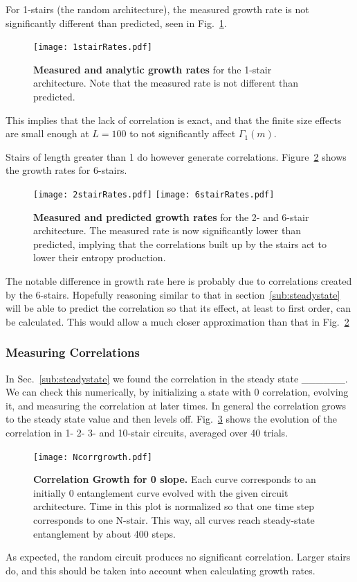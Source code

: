 For 1-stairs (the random architecture), the measured growth rate is not significantly different than predicted, seen in Fig.~\ref{fig:1stairRates}.
\begin{figure}
	\centering
	\texttt{[image: 1stairRates.pdf]}
	\caption{\textbf{Measured and analytic growth rates} for the 1-stair architecture. Note that the measured rate is not different than predicted.}
	\label{fig:1stairRates}
\end{figure}
This implies that the lack of correlation is exact, and that the finite size effects are small enough at $L=100$ to not significantly affect $\Gamma_1(m)$.

Stairs of length greater than 1 do however generate correlations. Figure~\ref{fig:6stairRates} shows the growth rates for 6-stairs. 
\begin{figure}
	\centering
	\texttt{[image: 2stairRates.pdf]}
	\texttt{[image: 6stairRates.pdf]}
	\caption{\textbf{Measured and predicted growth rates} for the 2- and 6-stair architecture. The measured rate is now significantly lower than predicted, implying that the correlations built up by the stairs act to lower their entropy production.}
	\label{fig:6stairRates}
\end{figure}
The notable difference in growth rate here is probably due to correlations created by the 6-stairs. Hopefully reasoning similar to that in section~\ref{sub:steadystate} will be able to predict the correlation so that its effect, at least to first order, can be calculated. This would allow a much closer approximation than that in Fig.~\ref{fig:6stairRates}

\subsubsection{Measuring Correlations}  \label{subsub:correlations}

In Sec.~\ref{sub:steadystate} we found the correlation in the steady state \_\_\_\_\_\_. We can check this numerically, by initializing a state with 0 correlation, evolving it, and measuring the correlation at later times. In general the correlation grows to the steady state value and then levels off. Fig.~\ref{fig:corrgrowth} shows the evolution of the correlation in 1- 2- 3- and 10-stair circuits, averaged over 40 trials.
\begin{figure}
	\centering
	\texttt{[image: Ncorrgrowth.pdf]}
	\caption{\textbf{Correlation Growth for 0 slope.} Each curve corresponds to an initially 0 entanglement curve evolved with the given circuit architecture. Time in this plot is normalized so that one time step corresponds to one N-stair. This way, all curves reach steady-state entanglement by about 400 steps.
	}
	\label{fig:corrgrowth}
\end{figure}
As expected, the random circuit produces no significant correlation. Larger stairs do, and this should be taken into account when calculating growth rates. 


